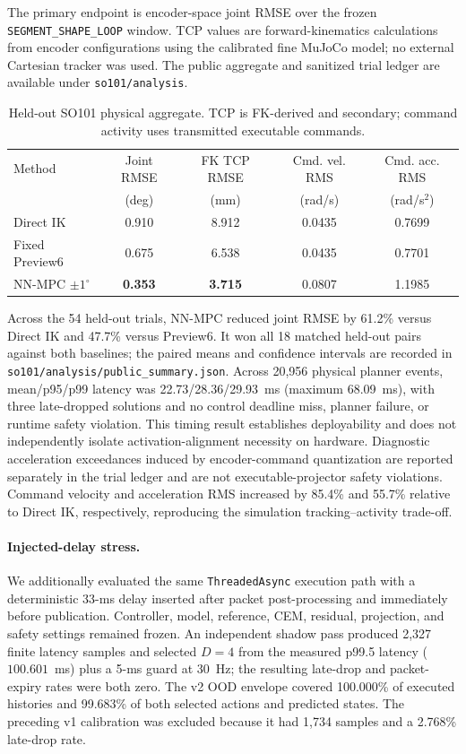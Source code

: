 \documentclass[10pt]{article}
\begin{document}
The primary endpoint is encoder-space joint RMSE over the frozen
\texttt{SEGMENT\_SHAPE\_LOOP} window. TCP values are forward-kinematics calculations
from encoder configurations using the calibrated fine MuJoCo model; no
external Cartesian tracker was used. The public aggregate and sanitized trial
ledger are available under \texttt{so101/analysis}.

\begin{table}[h]
\centering\scriptsize
\caption{Held-out SO101 physical aggregate. TCP is FK-derived and secondary;
command activity uses transmitted executable commands.}
\setlength{\tabcolsep}{3.0pt}
\begin{tabular}{lcccc}
\toprule
Method & Joint RMSE & FK TCP RMSE & Cmd. vel. RMS & Cmd. acc. RMS \\
 & (deg) & (mm) & (rad/s) & (rad/s$^2$) \\
\midrule
Direct IK & 0.910 & 8.912 & 0.0435 & 0.7699 \\
Fixed Preview6 & 0.675 & 6.538 & 0.0435 & 0.7701 \\
NN-MPC $\pm1^\circ$ & \textbf{0.353} & \textbf{3.715} & 0.0807 & 1.1985 \\
\bottomrule
\end{tabular}
\end{table}

Across the 54 held-out trials, NN-MPC reduced joint RMSE by 61.2\% versus
Direct IK and 47.7\% versus Preview6. It won all 18 matched held-out pairs
against both baselines; the paired means and confidence intervals are recorded
in \texttt{so101/analysis/public\_summary.json}. Across 20,956 physical planner
events, mean/p95/p99 latency was 22.73/28.36/29.93~ms (maximum 68.09~ms), with
three late-dropped solutions and no control deadline miss, planner failure, or
runtime safety violation. This timing result establishes deployability and
does not independently isolate activation-alignment necessity on hardware.
Diagnostic acceleration exceedances induced by encoder-command quantization are
reported separately in the trial ledger and are not executable-projector safety
violations.
Command velocity and acceleration RMS increased by 85.4\% and 55.7\% relative
to Direct IK, respectively, reproducing the simulation tracking--activity
trade-off.

\paragraph{Injected-delay stress.}
We additionally evaluated the same \texttt{ThreadedAsync} execution path with a
deterministic 33-ms delay inserted after packet post-processing and immediately
before publication. Controller, model, reference, CEM, residual, projection,
and safety settings remained frozen. An independent shadow pass produced 2,327
finite latency samples and selected $D=4$ from the measured p99.5 latency
($100.601$~ms) plus a 5-ms guard at 30~Hz; the resulting late-drop and
packet-expiry rates were both zero. The v2 OOD envelope covered 100.000\% of
executed histories and 99.683\% of both selected actions and predicted states.
The preceding v1 calibration was excluded because it had 1,734 samples and a
2.768\% late-drop rate.
\end{document}
